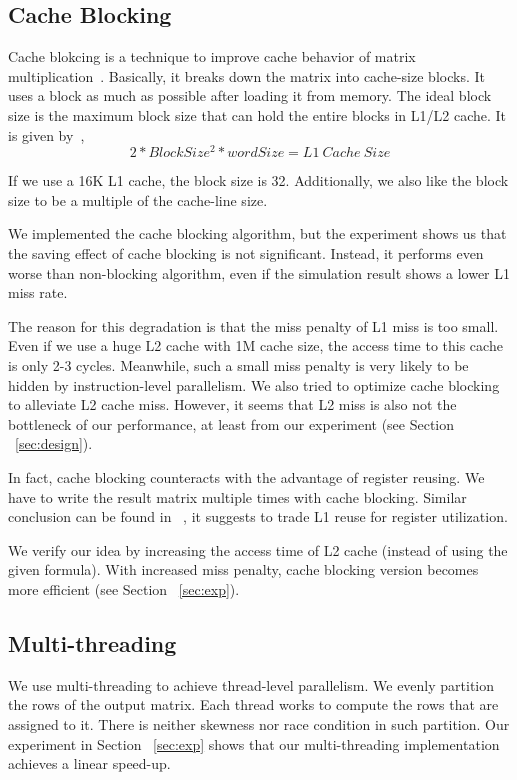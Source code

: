 \documentclass[twocolumn,letterpaper,10pt]{article}
\begin{document}
\subsection{Cache Blocking}
Cache blokcing is a technique to improve cache behavior of matrix
multiplication~\cite{block}. Basically, it breaks down the matrix into
cache-size blocks. It uses a block as much as
possible after loading it from memory. The ideal block size is
the maximum block size that can hold the entire blocks in L1/L2 cache. It
is given by~\cite{davis},
\begin{equation}
  2 * BlockSize^2 * wordSize = L1\ Cache\ Size
\end{equation}

If we use a 16K L1 cache, the block size is 32. Additionally, we also
like the block size to be a multiple of the cache-line size.

We implemented the cache blocking algorithm, but the experiment shows
us that the saving effect of cache blocking is not significant. Instead, it performs even worse than non-blocking
algorithm, even if the simulation result shows a lower L1 miss rate.

The reason for this degradation is that the miss penalty of L1 miss
is too small. Even if we use a huge L2 cache with 1M cache size, the
access time to this cache is only 2-3 cycles. Meanwhile, such a small miss
penalty is very likely to be hidden by instruction-level
parallelism. We also tried to optimize cache blocking to alleviate L2
cache miss. However, it seems that L2 miss is also not the bottleneck of
our performance, at least from our experiment (see Section ~\ref{sec:design}).

In fact, cache blocking counteracts with the advantage of
register reusing. We have to write the result matrix multiple times
with cache blocking. Similar conclusion can be found in
~\cite{revisited}, it suggests to trade L1 reuse for register utilization.

We verify our idea by increasing the access time of L2 cache (instead
of using the given formula). With increased miss penalty, cache
blocking version becomes more efficient (see Section ~\ref{sec:exp}).

\subsection{Multi-threading}
We use multi-threading to achieve thread-level parallelism. We evenly partition the rows of
the output matrix. Each thread works to compute the rows
that are assigned to it. There is neither skewness nor race condition in such
partition. Our experiment in Section ~\ref{sec:exp} shows that our multi-threading implementation achieves a linear speed-up.
\end{document}
